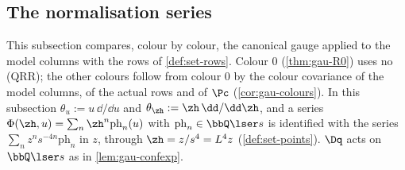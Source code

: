 
\subsection{The normalisation series}
\label{sec:gau-R0}

This subsection compares, colour by colour, the canonical gauge applied to the model columns with the rows of \cref{def:set-rows}. Colour $0$ (\cref{thm:gau-R0}) uses no (QRR); the other colours follow from colour $0$ by the colour covariance of the model columns, of the actual rows and of $\Pc$ (\cref{cor:gau-colours}). In this subsection $\theta_u:=u\,\dd/\dd u$ and $\theta_{\zh}:=\zh\,\dd/\dd\zh$, and a series $\Phi(\zh,u)=\sum_n\zh^n\mathrm{ph}_n(u)$ with $\mathrm{ph}_n\in\bbQ\lser s$ is identified with the series $\sum_nz^ns^{-4n}\mathrm{ph}_n$ in $z$, through $\zh=z/s^4=L^4z$ (\cref{def:set-points}). $\Dq$ acts on $\bbQ\lser s$ as in \cref{lem:gau-confexp}.

